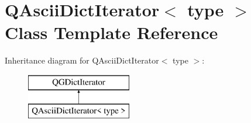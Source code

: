 \hypertarget{class_q_ascii_dict_iterator}{}\section{Q\+Ascii\+Dict\+Iterator$<$ type $>$ Class Template Reference}
\label{class_q_ascii_dict_iterator}
Inheritance diagram for Q\+Ascii\+Dict\+Iterator$<$ type $>$\+:\begin{figure}[H]
\begin{center}
\leavevmode
\includegraphics[height=2.000000cm]{class_q_ascii_dict_iterator}
\end{center}
\end{figure}

